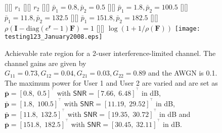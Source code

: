 \documentclass[10pt,twocolumn]{IEEEtran}
\newcommand{\0}{\mathbf{0}}
\newcommand{\1}{\mathbf{1}}
\newcommand{\trans}{^\top}
\begin{document}
\begin{figure}
    \centering
{}[][]{\hspace{.2in} \footnotesize  $r_1$}
[][]{\hspace{.2in} \footnotesize  $r_2$}        
[][]{\hspace{.2in} \footnotesize  $\bar{p}_1=0.8,\bar{p}_2=0.5$}
[][]{\hspace{.2in} \footnotesize  $\bar{p}_1=1.8,\bar{p}_2=100.5$}
[][]{\hspace{.2in} \footnotesize   $\bar{p}_1=11.8,\bar{p}_2=132.5$}
[][]{\hspace{.2in} \footnotesize  $\bar{p}_1=151.8,\bar{p}_2=182.5$}
[][]{\hspace{.2in} \footnotesize   $\rho( \mathbf{I}-\mbox{diag}(e^{\mathbf{r}}-1)\mathbf{F})=1$}
[][]{\hspace{.5in} \footnotesize  $\log (1+1/\rho(\mathbf{F}))$}
\texttt{[image: testing123\_January2008.eps]}
\caption{\label{2x2RateRegion} Achievable rate region for a 2-user interference-limited channel. The channel gains are given by $G_{11}=0.73,G_{12}= 0.04,G_{21}=0.03,G_{22}=0.89$ and the AWGN is 0.1. The maximum power for User 1 and User 2 are varied and are set as $\mathbf{\bar{p}}=[0.8, \; 0.5]^{\trans}$ with $\mathsf{SNR}=[7.66, \; 6.48]^{\trans}$ in dB, $\bar{\mathbf{p}}=[1.8, \; 100.5]^{\trans}$ with $\mathsf{SNR}=[11.19, \; 29.52]^{\trans}$ in dB, $\bar{\mathbf{p}}=[11.8, \; 132.5]^{\trans}$ with $\mathsf{SNR}=[19.35, \; 30.72]^{\trans}$ in dB and $\bar{\mathbf{p}}=[151.8, \; 182.5]^{\trans}$ with $\mathsf{SNR}=[30.45, \; 32.11]^{\trans}$ in dB.}
\end{figure}
\end{document}

